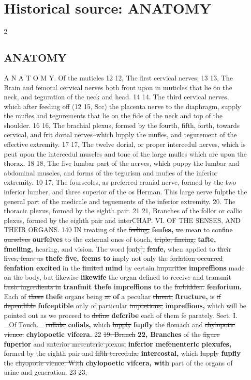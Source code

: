 \documentclass[10pt]{article}
\begin{document}
\section*{Historical source: ANATOMY}
\begin{multicols}{2}
\subsection*{ANATOMY}
A N A T O M Y. Of the muticles 12 12, The first cervical nerves; 13 13, The Brain and femoral cervical nerves both front upon in muticles that lie on the neck, and teguration of the neck and head. 14 14. The third cervical nerves, which after feeding off (12 15, Scc) the placenta nerve to the diaphragm, supply the mufles and tegurements that lie on the fide of the neck and top of the shoulder. 16 16, The brachial plexus, formed by the fourth, fifth, forth, towards cervical, and frit dorial nerves--which lupply the mufles, and tegurement of the effective extremity. 17 17, The twelve dorial, or proper intercedul nerves, which is peut upon the intercedul muscles and tone of the large mufles which are upon the thorax. 18 18, The five lumbar part of the nerves, which puppy the lumbar and abdominal muscles, and forms of the tegurism and mufles of the inferior extremity. 10 17, The fourscoles, as preferred cranial nerve, formed by the two inferior lumber, and three superior of the os Herman. This large nerve fulpthe the general part of the medicale and teguements of the inferior extremity. 20. The thoracic plexus, formed by the eighth pair. 21 21, Branches of the follor or callic plexus, formed by the eighth pair and interCHAP. VI. OF THE SENSES, AND THEIR ORGANS. 140 IN treating of the \sout{feeling,} \textbf{fenfes,} we mean to confine \sout{ourselves} \textbf{ourfelves} to the external ones of touch, \sout{triple, fineing,} \textbf{tafte, fmelling,} hearing, and vision. The word \sout{[only],} \textbf{fenfe,} when applied to \sout{their lives, fears us} \textbf{thefe five, feems to} imply not only the \sout{forlation occurred} \textbf{fenfation excited} in the \sout{limited} \textbf{mind} by certain \sout{impurities} \textbf{impreffions} made on the body, but \sout{likewise} \textbf{likewife} the organ defined to receive and \sout{transmit basic ingredients in} \textbf{tranfmit thefe impreffions to} the \sout{forbidden.} \textbf{fenforium.} Each of \sout{these} \textbf{thefe} organs being \sout{at} \textbf{of} a peculiar \sout{threat,} \textbf{ftructure,} is \sout{if dependible} \textbf{fufceptible} only of particular \sout{impretions,} \textbf{impreffions,} which will be pointed out as we proceed to \sout{define} \textbf{defcribe} each of them fe parately. Sect. I. \_Of Touch.\_ \sout{collals,} \textbf{cofials,} which \sout{lupply} \textbf{fupfly} the flomach and \sout{chylopotic vience.} \textbf{chylopoetic vifcera.} 22 \sout{19. Branch} \textbf{22, Branches} of the \sout{figure} \textbf{fuperior} and \sout{anterior mesenteric plexus,} \textbf{inferior mefenenteric plexufes,} formed by the eighth pair and \sout{fifth tercedula,} \textbf{intercostal,} which \sout{lupply} \textbf{fupfly} the \sout{chyopotic vience. With} \textbf{chylopoetic vifcera, with} part of the organs of urine and generation. 23 23, 
\end{multicols}
\end{document}
